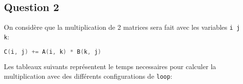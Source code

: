 \documentclass{article}
\begin{document}
\newpage\subsection*{Question 2}
\begin{resolution}
    On considère que la multiplication de 2 matrices sera fait avec les variables \texttt{i j k}:
    \begin{scriptsize}
        \mycode
        \begin{lstlisting}[language=C++]
    C(i, j) += A(i, k) * B(k, j)
        \end{lstlisting}
    \end{scriptsize}
    Les tableaux suivants représentent le temps necessaires pour calculer la multiplication avec des différents configurations de \texttt{loop}:
    \begin{center}
        \begin{minipage}[b]{0.3\textwidth}
        \end{minipage}
        \begin{minipage}[b]{0.3\textwidth}
        \end{minipage}
        \begin{minipage}[b]{0.3\textwidth}
\end{minipage}
\end{center}
\end{resolution}
\end{document}
